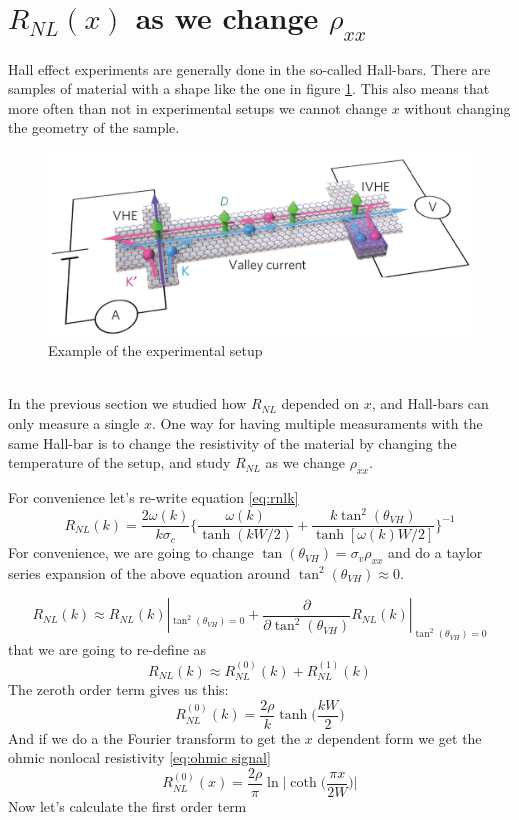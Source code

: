 \section{$R_{NL}(x)$ as we change $\rho_{xx}$}
Hall effect experiments are generally done in the so-called Hall-bars. There are samples of material with a shape like the one in figure \ref{fig:hall-bar}. This also means that more often than not in experimental setups we cannot change $x$ without changing the geometry of the sample.
\begin{figure}[h!]
    \centering
    \includegraphics[width=\linewidth]{Immagini/rnl/hallbarbrutta.png}
    \caption{Example of the experimental setup}
    \label{fig:hall-bar}
\end{figure}\\
In the previous section we studied how $R_{NL}$ depended on $x$, and Hall-bars can only measure a single $x$. One way for having multiple measuraments with the same Hall-bar is to change the resistivity of the material by changing the temperature of the setup, and study $R_{NL}$ as we change $\rho_{xx}$.

For convenience let's re-write equation \ref{eq:rnlk}
\[
    R_{NL}(k)=\frac{2\omega(k)}{k\sigma_c}
    \bigg\{
        \frac{\omega(k)}{\tanh(kW/2)} + \frac{k\tan^2(\theta_{VH})}{\tanh[\omega(k)W/2]}    
    \bigg\}^{-1}
\]
For convenience, we are going to change $\tan(\theta_{VH})=\sigma_v\rho_{xx}$ and do a taylor series expansion of the above equation around $\tan^2(\theta_{VH})\approx 0$.

\[
    R_{NL}(k)\approx R_{NL}(k)|_{\tan^2(\theta_{VH})=0} +
    \frac \partial {\partial \tan^2(\theta_{VH})} R_{NL}(k)|_{\tan^2(\theta_{VH})=0}
\]
that we are going to re-define as
\[
    R_{NL}(k)\approx R_{NL}^{(0)}(k) + R_{NL}^{(1)}(k)
\]
The zeroth order term gives us this:
\[
    R_{NL}^{(0)}(k)=\frac{2\rho}k\tanh\bigg(\frac{kW}2\bigg)
\]
And if we do a the Fourier transform to get the $x$ dependent form we get the ohmic nonlocal resistivity \ref{eq:ohmic signal}
\begin{equation}
    R_{NL}^{(0)}(x)=\frac{2\rho}\pi\ln\bigg |\coth \Big(\frac{\pi x}{2W}\Big)\bigg |
\end{equation}
Now let's calculate the first order term

